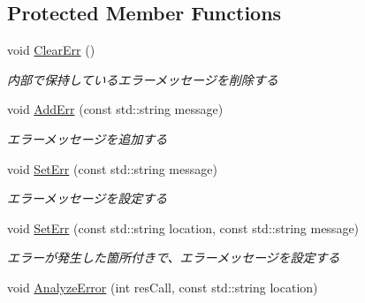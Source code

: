 \subsection*{Protected Member Functions}
\begin{DoxyCompactItemize}
\item 
void \hyperlink{class_lua_helper_af3908bd771ef0033a6b707fe6564179f}{Clear\+Err} ()\hypertarget{class_lua_helper_af3908bd771ef0033a6b707fe6564179f}{}\label{class_lua_helper_af3908bd771ef0033a6b707fe6564179f}

\begin{DoxyCompactList}\small\item\em 内部で保持しているエラーメッセージを削除する \end{DoxyCompactList}\item 
void \hyperlink{class_lua_helper_ac3eada7c179dea900429d765241753b6}{Add\+Err} (const std\+::string message)\hypertarget{class_lua_helper_ac3eada7c179dea900429d765241753b6}{}\label{class_lua_helper_ac3eada7c179dea900429d765241753b6}

\begin{DoxyCompactList}\small\item\em エラーメッセージを追加する \end{DoxyCompactList}\item 
void \hyperlink{class_lua_helper_a72d95ea138152397585d19ee6fd71e5c}{Set\+Err} (const std\+::string message)\hypertarget{class_lua_helper_a72d95ea138152397585d19ee6fd71e5c}{}\label{class_lua_helper_a72d95ea138152397585d19ee6fd71e5c}

\begin{DoxyCompactList}\small\item\em エラーメッセージを設定する \end{DoxyCompactList}\item 
void \hyperlink{class_lua_helper_af92c7905c59ecd5d69e72b005241e51e}{Set\+Err} (const std\+::string location, const std\+::string message)\hypertarget{class_lua_helper_af92c7905c59ecd5d69e72b005241e51e}{}\label{class_lua_helper_af92c7905c59ecd5d69e72b005241e51e}

\begin{DoxyCompactList}\small\item\em エラーが発生した箇所付きで、エラーメッセージを設定する \end{DoxyCompactList}\item 
void \hyperlink{class_lua_helper_ab40ba968a7d43f3eb87960ced519c6ba}{Analyze\+Error} (int res\+Call, const std\+::string location)\hypertarget{class_lua_helper_ab40ba968a7d43f3eb87960ced519c6ba}{}\label{class_lua_helper_ab40ba968a7d43f3eb87960ced519c6ba}


\end{DoxyCompactItemize}

